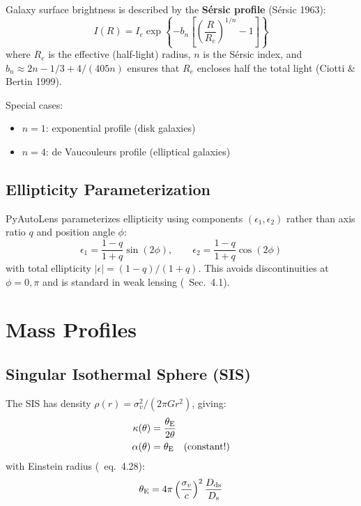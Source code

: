 \documentclass[11pt, letterpaper]{article}
\begin{document}
Galaxy surface brightness is described by the \textbf{S\'ersic profile}
(S\'ersic 1963):
\begin{equation}
I(R) = I_e \exp\left\{ -b_n \left[ \left(\frac{R}{R_e}\right)^{1/n} - 1 \right] \right\}
\label{eq:sersic}
\end{equation}
where $R_e$ is the effective (half-light) radius, $n$ is the S\'ersic
index, and $b_n \approx 2n - 1/3 + 4/(405n)$ ensures that $R_e$
encloses half the total light (Ciotti \& Bertin 1999).

Special cases:
\begin{itemize}[nosep]
  \item $n = 1$: exponential profile (disk galaxies)
  \item $n = 4$: de Vaucouleurs profile (elliptical galaxies)
\end{itemize}

\subsection{Ellipticity Parameterization}

PyAutoLens parameterizes ellipticity using components
$(\epsilon_1, \epsilon_2)$ rather than axis ratio $q$ and position
angle $\phi$:
\begin{equation}
\epsilon_1 = \frac{1-q}{1+q} \sin(2\phi), \qquad
\epsilon_2 = \frac{1-q}{1+q} \cos(2\phi)
\label{eq:ell-comps}
\end{equation}
with total ellipticity $|\epsilon| = (1-q)/(1+q)$. This avoids
discontinuities at $\phi = 0, \pi$ and is standard in weak lensing
(\NB\ Sec.~4.1).

\section{Mass Profiles}
\label{sec:mass-profiles}

\subsection{Singular Isothermal Sphere (SIS)}

The SIS has density $\rho(r) = \sigma_v^2 / (2\pi G r^2)$, giving:
\begin{align}
\kappa(\theta) &= \frac{\theta_{\rm E}}{2\theta} \label{eq:sis-kappa} \\
\alpha(\theta) &= \theta_{\rm E} \quad \text{(constant!)} \label{eq:sis-alpha}
\end{align}
with Einstein radius (\CK\ eq.~4.28):
\begin{equation}
\theta_{\rm E} = 4\pi \left(\frac{\sigma_v}{c}\right)^2 \frac{D_{\rm ds}}{D_{\rm s}}
\label{eq:sis-thetaE}
\end{equation}
\end{document}
